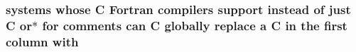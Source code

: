 \subsubsection{\setlength{\rightskip}{0pt plus 5cm}systems whose C Fortran {\bf compilers} support instead of just C or$\ast$ for {\bf comments} can C globally replace a C in the first column {\bf with}}\label{mpif_8h_85d7fd0be66a2a78ada1d90021e4f3b2}


